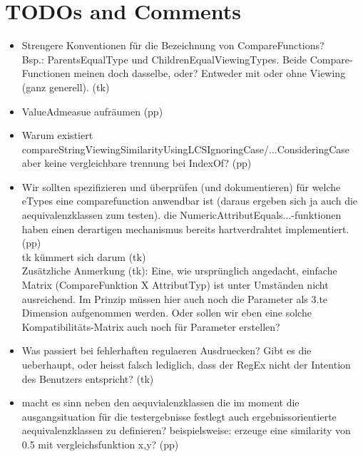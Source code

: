 %
%

\chapter*{TODOs and Comments}
\label{chap:todos-comments}

\begin{itemize}

\item Strengere Konventionen für die Bezeichnung von CompareFunctions?\\
Bsp.: ParentsEqualType und ChildrenEqualViewingTypes. Beide Compare-Functionen meinen doch dasselbe, oder? Entweder mit oder ohne Viewing (ganz generell). (tk)

\item ValueAdmeasue aufräumen (pp)

\item Warum existiert compareStringViewingSimilarityUsingLCSIgnoringCase/...ConsideringCase
aber keine vergleichbare trennung bei IndexOf? (pp)

\item Wir sollten spezifizieren und überprüfen (und dokumentieren) für welche eTypes eine
comparefunction anwendbar ist (daraus ergeben sich ja auch die aequivalenzklassen 
zum testen). die NumericAttributEquals...-funktionen haben
einen derartigen mechanismus bereits hartverdrahtet implementiert. (pp)\\
tk kümmert sich darum (tk)\\
Zusätzliche Anmerkung (tk): Eine, wie ursprünglich angedacht, einfache Matrix (CompareFunktion X AttributTyp) ist unter Umständen nicht ausreichend. Im Prinzip müssen hier auch noch die Parameter als 3.te Dimension aufgenommen werden. Oder sollen wir eben eine solche Kompatibilitäts-Matrix auch noch für Parameter erstellen?

\item Was passiert bei fehlerhaften regulaeren Ausdruecken? Gibt es die ueberhaupt, 
oder heisst falsch lediglich, dass der RegEx nicht der Intention des 
Benutzers entspricht? (tk)

\item macht es sinn neben den aequvialenzklassen die im moment die ausgangsituation für 
die testergebnisse festlegt auch ergebnissorientierte aequivalenzklassen zu definieren? 
beispielsweise: erzeuge eine similarity von 0.5 mit vergleichsfunktion x,y? (pp)


\end{itemize}
